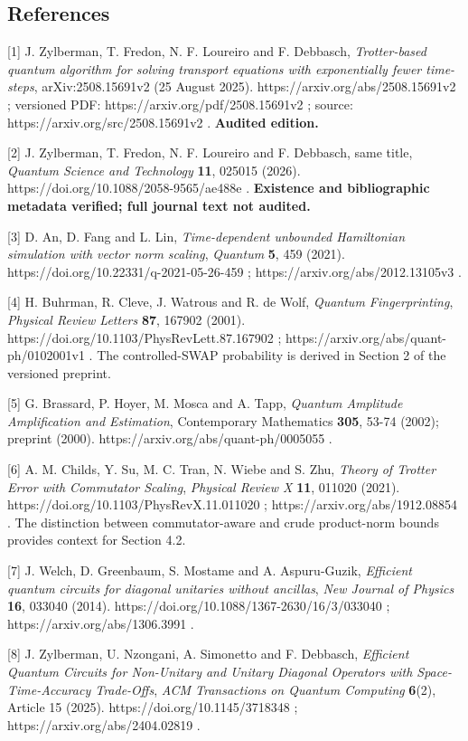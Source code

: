 \subsection{References}\label{references}

{[}1{]} J. Zylberman, T. Fredon, N. F. Loureiro and F. Debbasch,
\emph{Trotter-based quantum algorithm for solving transport equations
with exponentially fewer time-steps}, arXiv:2508.15691v2 (25 August
2025). https://arxiv.org/abs/2508.15691v2 ; versioned PDF:
https://arxiv.org/pdf/2508.15691v2 ; source:
https://arxiv.org/src/2508.15691v2 . \textbf{Audited edition.}

{[}2{]} J. Zylberman, T. Fredon, N. F. Loureiro and F. Debbasch, same
title, \emph{Quantum Science and Technology} \textbf{11}, 025015 (2026).
https://doi.org/10.1088/2058-9565/ae488e . \textbf{Existence and
bibliographic metadata verified; full journal text not audited.}

{[}3{]} D. An, D. Fang and L. Lin, \emph{Time-dependent unbounded
Hamiltonian simulation with vector norm scaling}, \emph{Quantum}
\textbf{5}, 459 (2021). https://doi.org/10.22331/q-2021-05-26-459 ;
https://arxiv.org/abs/2012.13105v3 .

{[}4{]} H. Buhrman, R. Cleve, J. Watrous and R. de Wolf, \emph{Quantum
Fingerprinting}, \emph{Physical Review Letters} \textbf{87}, 167902
(2001). https://doi.org/10.1103/PhysRevLett.87.167902 ;
https://arxiv.org/abs/quant-ph/0102001v1 . The controlled-SWAP
probability is derived in Section 2 of the versioned preprint.

{[}5{]} G. Brassard, P. Hoyer, M. Mosca and A. Tapp, \emph{Quantum
Amplitude Amplification and Estimation}, Contemporary Mathematics
\textbf{305}, 53-74 (2002); preprint (2000).
https://arxiv.org/abs/quant-ph/0005055 .

{[}6{]} A. M. Childs, Y. Su, M. C. Tran, N. Wiebe and S. Zhu,
\emph{Theory of Trotter Error with Commutator Scaling}, \emph{Physical
Review X} \textbf{11}, 011020 (2021).
https://doi.org/10.1103/PhysRevX.11.011020 ;
https://arxiv.org/abs/1912.08854 . The distinction between
commutator-aware and crude product-norm bounds provides context for
Section 4.2.

{[}7{]} J. Welch, D. Greenbaum, S. Mostame and A. Aspuru-Guzik,
\emph{Efficient quantum circuits for diagonal unitaries without
ancillas}, \emph{New Journal of Physics} \textbf{16}, 033040 (2014).
https://doi.org/10.1088/1367-2630/16/3/033040 ;
https://arxiv.org/abs/1306.3991 .

{[}8{]} J. Zylberman, U. Nzongani, A. Simonetto and F. Debbasch,
\emph{Efficient Quantum Circuits for Non-Unitary and Unitary Diagonal
Operators with Space-Time-Accuracy Trade-Offs}, \emph{ACM Transactions
on Quantum Computing} \textbf{6}(2), Article 15 (2025).
https://doi.org/10.1145/3718348 ; https://arxiv.org/abs/2404.02819 .
